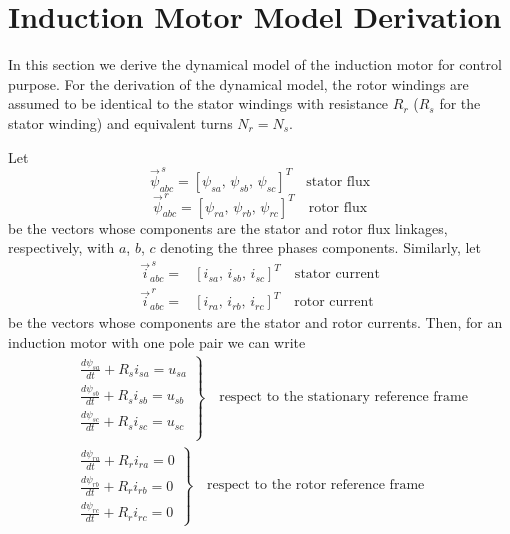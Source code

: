 \documentclass[11pt,a4paper,oneside]{book}
\numberwithin{equation}{section}
\theoremstyle{it}
\theoremstyle{definition}
\begin{document}
\section{Induction Motor Model Derivation}
In this section we derive the dynamical model of the induction motor for 
control purpose. For the derivation of the dynamical model, the rotor windings 
are assumed to be identical to the stator windings with resistance $R_r$ ($R_s$ 
for the stator winding) and equivalent turns $N_r=N_s$.

Let
\begin{equation} \label{im_eq_1}
	\vec{\psi}^{\,s}_{abc} = \left[\psi_{sa},\,\psi_{sb},\,\psi_{sc}\right]^T 
	\quad\text{stator flux}
\end{equation}
\begin{equation} \label{im_eq_2}
	\vec{\psi}^{\,r}_{abc} = \left[\psi_{ra},\,\psi_{rb},\,\psi_{rc}\right]^T 
	\quad\text{rotor flux}
\end{equation}
be the vectors whose components are the stator and rotor flux linkages, 
respectively, with $a$, $b$, $c$ denoting the three phases components. 
Similarly, let
\begin{equation} \label{im_eq_3}
	\begin{aligned}
		\vec{i}^{\,s}_{abc} = & \left[i_{sa},\,i_{sb},\,i_{sc}\right]^T 
		\quad\text{stator current} \\ 
		\vec{i}^{\,r}_{abc} = & \left[i_{ra},\,i_{rb},\,i_{rc}\right]^T 
		\quad\text{rotor current}
	\end{aligned}
\end{equation}
be the vectors whose components are the stator and rotor currents. Then, for an 
induction motor with one pole pair we can write
\begin{equation} \label{im_eq_4}
	\begin{aligned}
		&\left. \begin{aligned}
			& \frac{d\psi_{sa}}{dt} + R_s i_{sa} = u_{sa} \\[6pt]
			& \frac{d\psi_{sb}}{dt} + R_s i_{sb} = u_{sb} \\[6pt]
			& \frac{d\psi_{sc}}{dt} + R_s i_{sc} = u_{sc} \\[6pt]
		\end{aligned}\right\rbrace \quad\text{respect to the stationary 
			reference frame}\\[6pt]
		&\left. \begin{aligned}
			& \frac{d\psi_{ra}}{dt} + R_r i_{ra} = 0 \\[6pt]
			& \frac{d\psi_{rb}}{dt} + R_r i_{rb} = 0 \\[6pt]
			& \frac{d\psi_{rc}}{dt} + R_r i_{rc} = 0 
		\end{aligned} \right\rbrace \quad\text{respect to the rotor reference 
			frame}
	\end{aligned}
\end{equation}
\end{document}
